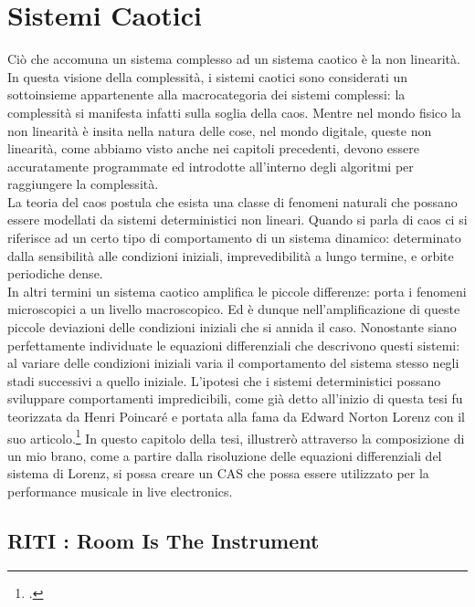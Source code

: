 \section{Sistemi Caotici}
\label{sec:Sistemi Caotici}

Ciò che accomuna un sistema complesso ad un sistema caotico è la non linearità.
In questa visione della complessità, i sistemi caotici sono considerati un sottoinsieme 
appartenente alla macrocategoria dei sistemi complessi: la complessità 
si manifesta infatti sulla soglia della caos. 
Mentre nel mondo fisico la non linearità è insita nella natura
delle cose, nel mondo digitale, queste non linearità, come abbiamo visto
anche nei capitoli precedenti, devono essere accuratamente
programmate ed introdotte all’interno degli algoritmi per raggiungere la complessità. \\
La teoria del caos postula che esista una classe di fenomeni naturali che
possano essere modellati da sistemi deterministici non lineari.
Quando si parla di caos ci si riferisce ad un certo tipo di comportamento di
un sistema dinamico: determinato dalla sensibilità alle condizioni iniziali,
imprevedibilità a lungo termine, e orbite periodiche dense. \\ 
In altri termini un sistema caotico amplifica le piccole differenze: porta i fenomeni microscopici
a un livello macroscopico. Ed è dunque nell’amplificazione di queste piccole
deviazioni delle condizioni iniziali che si annida il caso.
Nonostante siano perfettamente individuate le equazioni differenziali che
descrivono questi sistemi: al variare delle condizioni iniziali 
varia il comportamento del sistema stesso negli stadi successivi a quello iniziale.
L’ipotesi che i sistemi deterministici possano sviluppare comportamenti impredicibili, 
come già detto all'inizio di questa tesi fu teorizzata da Henri Poincaré e portata alla
fama da Edward Norton Lorenz con il suo articolo.\footcite{Lorenzdnf}
In questo capitolo della tesi, illustrerò attraverso la composizione di un mio brano, 
come a partire dalla risoluzione delle equazioni differenziali del sistema di Lorenz, si possa
creare un CAS che possa essere utilizzato per la
performance musicale in live electronics.

\subsection{RITI : Room Is The Instrument}
\label{RITI : Room Is The Instrument}


